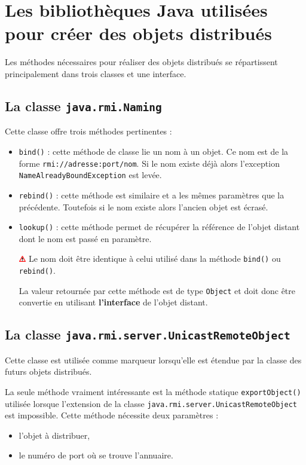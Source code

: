 \documentclass[a4paper,11pt]{report}
\newcommand{\attention}[1]{
	\begin{center}
	\medskip
	\colorbox{attention}{
		\begin{minipage}{0.8\textwidth}\medskip\includegraphics[height=10px]{images/attention.png} #1 \medskip\end{minipage}
	}
	\medskip
	\end{center}
}
\begin{document}
\section{Les bibliothèques Java utilisées pour créer des objets distribués}

Les méthodes nécessaires pour réaliser des objets distribués se répartissent principalement dans trois classes et une interface.

\subsection{La classe \texttt{java.rmi.Naming}}
Cette classe offre trois méthodes pertinentes :
\begin{itemize}
\item \texttt{bind()} : cette méthode de classe lie un nom à un objet. Ce nom est de la forme \texttt{rmi://adresse:port/nom}. Si le nom existe déjà alors l'exception \texttt{NameAlreadyBoundException} est levée.
\item \texttt{rebind()} : cette méthode est similaire et a les mêmes paramètres que la précédente. Toutefois si le nom existe alors l'ancien objet est écrasé.
\item \texttt{lookup()} : cette méthode permet de récupérer la référence de l'objet distant dont le nom est passé en paramètre.
\attention{Le nom doit être identique à celui utilisé dans la méthode \texttt{bind()} ou \texttt{rebind()}.}
La valeur retournée par cette méthode est de type \texttt{Object} et doit donc être convertie en utilisant \textbf{l'interface} de l'objet distant.
\end{itemize}

\subsection{La classe \texttt{java.rmi.server.UnicastRemoteObject}}
Cette classe est utilisée comme marqueur lorsqu'elle est étendue par la classe des futurs objets distribués.

La seule méthode vraiment intéressante est la méthode statique \texttt{exportObject()} utilisée lorsque l'extension de la classe \texttt{java.rmi.server.UnicastRemoteObject} est impossible. Cette méthode nécessite deux paramètres :
\begin{itemize}
\item l'objet à distribuer,
\item le numéro de port où se trouve l'annuaire.
\end{itemize}
\end{document}
